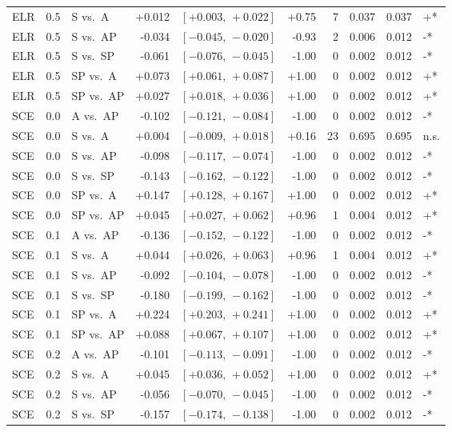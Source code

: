 \begin{landscape}
\begin{scriptsize}
\begin{longtable}{lllrrrrrrl}
ELR & 0.5 & S vs.\ A & +0.012 & $[+0.003,\,+0.022]$ & +0.75 & 7 & 0.037 & 0.037 & +* \\
ELR & 0.5 & S vs.\ AP & -0.034 & $[-0.045,\,-0.020]$ & -0.93 & 2 & 0.006 & 0.012 & -* \\
ELR & 0.5 & S vs.\ SP & -0.061 & $[-0.076,\,-0.045]$ & -1.00 & 0 & 0.002 & 0.012 & -* \\
ELR & 0.5 & SP vs.\ A & +0.073 & $[+0.061,\,+0.087]$ & +1.00 & 0 & 0.002 & 0.012 & +* \\
ELR & 0.5 & SP vs.\ AP & +0.027 & $[+0.018,\,+0.036]$ & +1.00 & 0 & 0.002 & 0.012 & +* \\
SCE & 0.0 & A vs.\ AP & -0.102 & $[-0.121,\,-0.084]$ & -1.00 & 0 & 0.002 & 0.012 & -* \\
SCE & 0.0 & S vs.\ A & +0.004 & $[-0.009,\,+0.018]$ & +0.16 & 23 & 0.695 & 0.695 & n.s. \\
SCE & 0.0 & S vs.\ AP & -0.098 & $[-0.117,\,-0.074]$ & -1.00 & 0 & 0.002 & 0.012 & -* \\
SCE & 0.0 & S vs.\ SP & -0.143 & $[-0.162,\,-0.122]$ & -1.00 & 0 & 0.002 & 0.012 & -* \\
SCE & 0.0 & SP vs.\ A & +0.147 & $[+0.128,\,+0.167]$ & +1.00 & 0 & 0.002 & 0.012 & +* \\
SCE & 0.0 & SP vs.\ AP & +0.045 & $[+0.027,\,+0.062]$ & +0.96 & 1 & 0.004 & 0.012 & +* \\
SCE & 0.1 & A vs.\ AP & -0.136 & $[-0.152,\,-0.122]$ & -1.00 & 0 & 0.002 & 0.012 & -* \\
SCE & 0.1 & S vs.\ A & +0.044 & $[+0.026,\,+0.063]$ & +0.96 & 1 & 0.004 & 0.012 & +* \\
SCE & 0.1 & S vs.\ AP & -0.092 & $[-0.104,\,-0.078]$ & -1.00 & 0 & 0.002 & 0.012 & -* \\
SCE & 0.1 & S vs.\ SP & -0.180 & $[-0.199,\,-0.162]$ & -1.00 & 0 & 0.002 & 0.012 & -* \\
SCE & 0.1 & SP vs.\ A & +0.224 & $[+0.203,\,+0.241]$ & +1.00 & 0 & 0.002 & 0.012 & +* \\
SCE & 0.1 & SP vs.\ AP & +0.088 & $[+0.067,\,+0.107]$ & +1.00 & 0 & 0.002 & 0.012 & +* \\
SCE & 0.2 & A vs.\ AP & -0.101 & $[-0.113,\,-0.091]$ & -1.00 & 0 & 0.002 & 0.012 & -* \\
SCE & 0.2 & S vs.\ A & +0.045 & $[+0.036,\,+0.052]$ & +1.00 & 0 & 0.002 & 0.012 & +* \\
SCE & 0.2 & S vs.\ AP & -0.056 & $[-0.070,\,-0.045]$ & -1.00 & 0 & 0.002 & 0.012 & -* \\
SCE & 0.2 & S vs.\ SP & -0.157 & $[-0.174,\,-0.138]$ & -1.00 & 0 & 0.002 & 0.012 & -* \\

\end{longtable}
\end{scriptsize}
\end{landscape}
